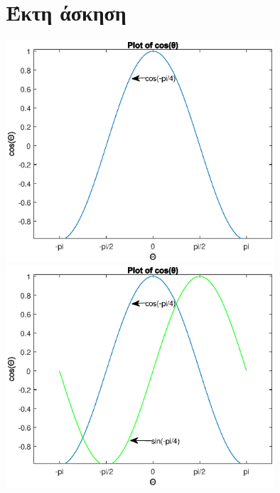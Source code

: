 \documentclass[a4paper,11pt]{article}
\begin{document}
\section{Έκτη άσκηση}
\begin{center}
\includegraphics[width=10cm]{cosx.eps}\\
\includegraphics[width=10cm]{sinx.eps}
\end{center}



\end{document}
